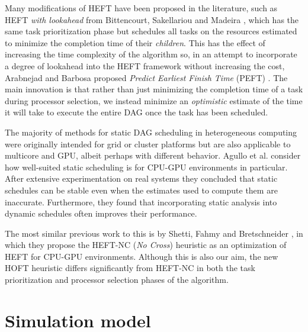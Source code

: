 \documentclass[runningheads]{llncs}
\begin{document}
Many modifications of HEFT have been proposed in the literature, such as HEFT {\em with lookahead} from Bittencourt, Sakellariou and Madeira \cite{bittencourt10}, which has the same task prioritization phase but schedules all tasks on the resources estimated to minimize the completion time of their {\em children}. This has the effect of increasing the time complexity of the algorithm so, in an attempt to incorporate a degree of lookahead into the HEFT framework without increasing the cost, Arabnejad and Barbosa proposed {\em Predict Earliest Finish Time} (PEFT) \cite{arabnejad14}. The main innovation is that rather than just minimizing the completion time of a task during processor selection, we instead minimize an {\em optimistic} estimate of the time it will take to execute the entire DAG once the task has been scheduled.

The majority of methods for static DAG scheduling in heterogeneous computing were originally intended for grid or cluster platforms but are also applicable to multicore and GPU, albeit perhaps with different behavior. Agullo et al. \cite{agullo2016} consider how well-suited static scheduling is for CPU-GPU environments in particular. After extensive experimentation on real systems they concluded that static schedules can be stable even when the estimates used to compute them are inaccurate. Furthermore, they found that incorporating static analysis into dynamic schedules often improves their performance. 

The most similar previous work to this is by Shetti, Fahmy and Bretschneider \cite{shetti2013optimization}, in which they propose the HEFT-NC ({\em No Cross}) heuristic as an optimization of HEFT for CPU-GPU environments. Although this is also our aim, the new HOFT heuristic differs significantly from HEFT-NC in both the task prioritization and processor selection phases of the algorithm. 


\section{Simulation model}
\label{sect.simulator}
\end{document}
